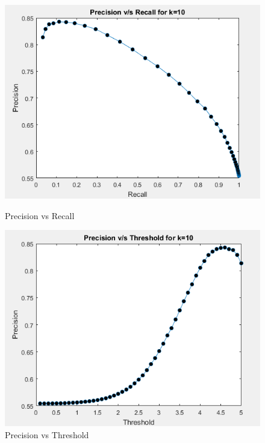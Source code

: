 \documentclass[12pt, onecolumn]{IEEEtran}
\begin{document}
\begin{figure}[h!]
\centering
\begin{minipage}{.5\textwidth}
\centering
\captionsetup{justification=centering}
\includegraphics[width=0.9\linewidth]{Graphs/3-1}
\caption{Precision vs Recall}
\end{minipage}%
\begin{minipage}{.5\textwidth}
\centering
\captionsetup{justification=centering}
\includegraphics[width=0.9\linewidth]{Graphs/3-4}
\caption{Precision vs Threshold}
\end{minipage}
\end{figure}
\end{document}
